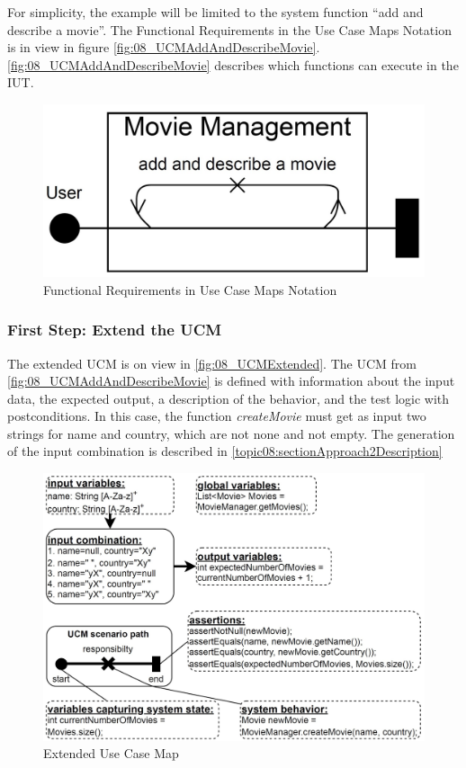 For simplicity, the example will be limited to the system function \enquote{add and describe a movie}. The Functional Requirements in the Use Case Maps Notation is in view in figure \autoref{fig:08_UCMAddAndDescribeMovie}. \autoref{fig:08_UCMAddAndDescribeMovie} describes which functions can execute in the IUT.

\begin{figure}[h]
	\centering
	\includegraphics[scale=0.25]{../images/08/08_UCMAddAndDescribeMovie.jpg} 
	\caption{Functional Requirements in Use Case Maps Notation}
	\label{fig:08_UCMAddAndDescribeMovie}
\end{figure}

\subsubsection{First Step: Extend the UCM}
The extended UCM is on view in \autoref{fig:08_UCMExtended}. The UCM from \autoref{fig:08_UCMAddAndDescribeMovie} is defined with information about the input
data, the expected output, a description of the behavior, and the test logic with postconditions. In this case, the function \textit{createMovie} must get as input two strings for name and country, which are not none and not empty. The generation of the input combination is described in \autoref{topic08:sectionApproach2Description}

\begin{figure}[h!]
	\centering
	\includegraphics[scale=0.43]{../images/08/08_UCMExtended.jpg} 
	\caption{Extended Use Case Map}
	\label{fig:08_UCMExtended}
\end{figure}

